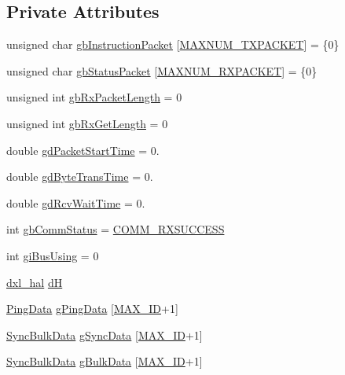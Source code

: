 \subsection*{Private Attributes}
\begin{DoxyCompactItemize}
\item 
unsigned char \hyperlink{classdynamixel2_a298efe9115fdbf77019af1001e801fb4}{gb\+Instruction\+Packet} \mbox{[}\hyperlink{dxl__hal_8h_ad753363487043da5d9fdd3fd1071f59e}{M\+A\+X\+N\+U\+M\+\_\+\+T\+X\+P\+A\+C\+K\+E\+T}\mbox{]} = \{0\}
\item 
unsigned char \hyperlink{classdynamixel2_a0776f210a190cf57d1a6faf9697a593d}{gb\+Status\+Packet} \mbox{[}\hyperlink{dxl__hal_8h_a37d5ce8f0a9ee058fa9674502c6a8b3a}{M\+A\+X\+N\+U\+M\+\_\+\+R\+X\+P\+A\+C\+K\+E\+T}\mbox{]} = \{0\}
\item 
unsigned int \hyperlink{classdynamixel2_a7ae9bffcc9f4b087c57640881ccbb378}{gb\+Rx\+Packet\+Length} = 0
\item 
unsigned int \hyperlink{classdynamixel2_ad82d286e6b47c7243a3c5fd5ced0ebf4}{gb\+Rx\+Get\+Length} = 0
\item 
double \hyperlink{classdynamixel2_ac9746f2c7ed6d706152d6d0d502993c0}{gd\+Packet\+Start\+Time} = 0.
\item 
double \hyperlink{classdynamixel2_a786e818a88ec65d3b7e2f30b55ec31ba}{gd\+Byte\+Trans\+Time} = 0.
\item 
double \hyperlink{classdynamixel2_ae7b830369861e191120f9b310a68e2d8}{gd\+Rcv\+Wait\+Time} = 0.
\item 
int \hyperlink{classdynamixel2_a703e327ba8ec5909c238dc94a00cb32d}{gb\+Comm\+Status} = \hyperlink{dynamixel_8h_a171328d9f298535c18d079f65e631434}{C\+O\+M\+M\+\_\+\+R\+X\+S\+U\+C\+C\+E\+S\+S}
\item 
int \hyperlink{classdynamixel2_a7fc43b4c4b7e36aa8f0420b037658f83}{gi\+Bus\+Using} = 0
\item 
\hyperlink{classdxl__hal}{dxl\+\_\+hal} \hyperlink{classdynamixel2_a69e9133771b69c828c277cb7191d3474}{d\+H}
\item 
\hyperlink{dynamixel_8h_ac9fd59581222be7f70502a24c1f2260d}{Ping\+Data} \hyperlink{classdynamixel2_ae5cf4b09150f4a480ee23279c4e97486}{g\+Ping\+Data} \mbox{[}\hyperlink{dynamixel_8h_a1cdef4472847c938fc165b7d2737c4e4}{M\+A\+X\+\_\+\+I\+D}+1\mbox{]}
\item 
\hyperlink{dynamixel_8h_a8add985a0a86464eeca56e82ecda62d7}{Sync\+Bulk\+Data} \hyperlink{classdynamixel2_a5923ec2418ab7ea83cbe365ad8b200d5}{g\+Sync\+Data} \mbox{[}\hyperlink{dynamixel_8h_a1cdef4472847c938fc165b7d2737c4e4}{M\+A\+X\+\_\+\+I\+D}+1\mbox{]}
\item 
\hyperlink{dynamixel_8h_a8add985a0a86464eeca56e82ecda62d7}{Sync\+Bulk\+Data} \hyperlink{classdynamixel2_a5083923283d17a820b3deb940c7211a5}{g\+Bulk\+Data} \mbox{[}\hyperlink{dynamixel_8h_a1cdef4472847c938fc165b7d2737c4e4}{M\+A\+X\+\_\+\+I\+D}+1\mbox{]}
\end{DoxyCompactItemize}


